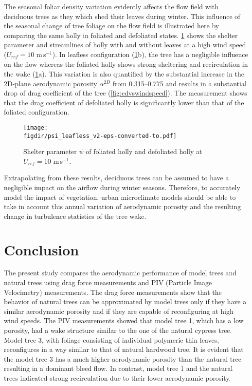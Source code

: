 The seasonal foliar density variation evidently affects the flow field with deciduous trees as they which shed their leaves during winter. This influence of the seasonal change of tree foliage on the flow field is illustrated here by comparing the same holly in foliated and defoliated states. \cref{fig:psileafless} shows the shelter parameter and streamlines of holly with and without leaves at a high wind speed ($U_{\textit{ref}}=10$ m\,s$^{-1}$). In leafless configuration (\cref{fig:psileafless}b), the tree has a negligible influence on the flow whereas the foliated holly shows strong sheltering and recirculation in the wake (\cref{fig:psileafless}a). This variation is also quantified by the substantial increase in the 2D-plane aerodynamic porosity $\alpha^{2D}$ from \numrange{0.315}{0.775} and results in a substantial drop of drag coefficient of the tree (\cref{fig:cdvswindspeed}). The measurement shows that the drag coefficient of defoliated holly is significantly lower than that of the foliated configuration. 

	\begin{figure}[t]
	\centering
	\texttt{[image: \\figdir/psi\_leafless\_v2-eps-converted-to.pdf]}
	\caption{Shelter parameter $\psi$ of  foliated holly and  defoliated holly at $U_{\textit{ref}}=10$ m\,s$^{-1}$.}
	\label{fig:psileafless}
	\end{figure}

Extrapolating from these results, deciduous trees can be assumed to have a negligible impact on the airflow during winter seasons. Therefore, to accurately model the impact of vegetation, urban microclimate models should be able to take in account this annual variation of aerodynamic porosity and the resulting change in turbulence statistics of the tree wake.

\section{Conclusion}

The present study compares the aerodynamic performance of model trees and natural trees using drag force measurements and PIV (Particle Image Velocimetry) measurements. The drag force measurements show that the behavior of natural trees can be approximated by model trees only if they have a similar aerodynamic porosity and if they are capable of reconfiguring at high wind speeds. The PIV measurements showed that model tree 1, which has a low porosity, had a wake structure similar to the one of the natural cypress tree. Model tree 3, with foliage consisting of individual polymeric thin leaves, reconfigures in a way similar to that of natural hardwood tree. It is evident that the model tree 3 has a much higher aerodynamic porosity than the natural tree resulting in a dominant bleed flow. In contrast, model tree 1 and the natural trees indicated strong recirculation due to their lower aerodynamic porosity.

